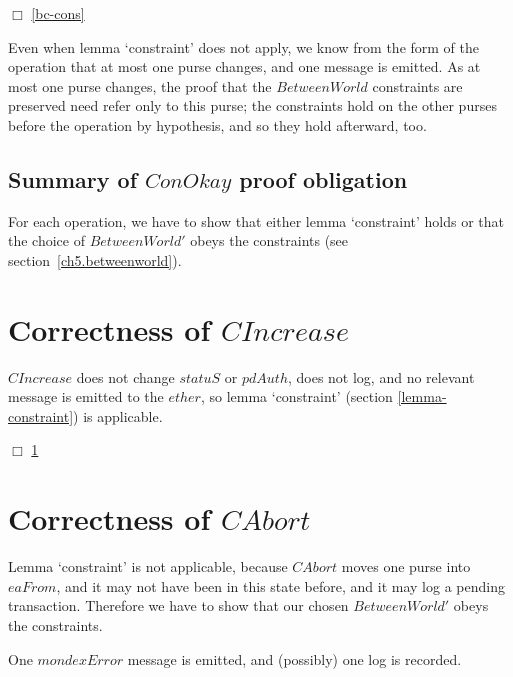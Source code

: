 $\Box$ \ref{bc-cons}

\noindent Even when lemma `constraint' does not apply, we know from
the form of the operation that at most one purse changes, and one
message is emitted.  As at most one purse changes, the proof that
the $BetweenWorld$ constraints are preserved need refer only to this
purse; the constraints hold on the other purses before the operation
by hypothesis, and so they hold afterward, too.
\subsection{Summary of $ConOkay$ proof obligation}
\label{bc-summary}
For each operation, we have to show that either lemma `constraint'
holds or that the choice of $BetweenWorld'$ obeys the constraints
(see section~\ref{ch5.betweenworld}).
\section{Correctness of $CIncrease$}
\label{bc-increase}
$CIncrease$ does not change $statuS$ or $pdAuth$, does not log, and
no relevant message is emitted to the $ether$, so lemma `constraint'
(section \ref{lemma-constraint}) is applicable.

$\Box$ \ref{bc-increase}
\section{Correctness of $CAbort$}
\label{bc-abort}
Lemma `constraint' is not applicable, because $CAbort$ moves one
purse into $eaFrom$, and it may not have been in this state before,
and it may log a pending transaction.  Therefore we have to show
that our chosen $BetweenWorld'$ obeys the constraints.

One $mondexError$ message is emitted, and (possibly) one log is recorded.

